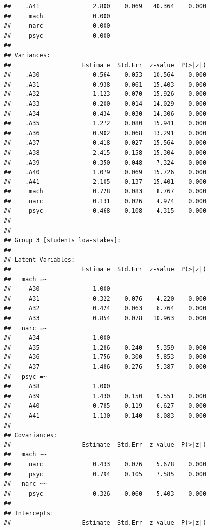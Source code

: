 \documentclass[
  english,
  man]{apa6}
\begin{document}
\begin{verbatim}
##    .A41               2.800    0.069   40.364    0.000
##     mach              0.000                           
##     narc              0.000                           
##     psyc              0.000                           
## 
## Variances:
##                    Estimate  Std.Err  z-value  P(>|z|)
##    .A30               0.564    0.053   10.564    0.000
##    .A31               0.938    0.061   15.403    0.000
##    .A32               1.123    0.070   15.926    0.000
##    .A33               0.200    0.014   14.029    0.000
##    .A34               0.434    0.030   14.306    0.000
##    .A35               1.272    0.080   15.941    0.000
##    .A36               0.902    0.068   13.291    0.000
##    .A37               0.418    0.027   15.564    0.000
##    .A38               2.415    0.158   15.304    0.000
##    .A39               0.350    0.048    7.324    0.000
##    .A40               1.079    0.069   15.726    0.000
##    .A41               2.105    0.137   15.401    0.000
##     mach              0.728    0.083    8.767    0.000
##     narc              0.131    0.026    4.974    0.000
##     psyc              0.468    0.108    4.315    0.000
## 
## 
## Group 3 [students low-stakes]:
## 
## Latent Variables:
##                    Estimate  Std.Err  z-value  P(>|z|)
##   mach =~                                             
##     A30               1.000                           
##     A31               0.322    0.076    4.220    0.000
##     A32               0.424    0.063    6.764    0.000
##     A33               0.854    0.078   10.963    0.000
##   narc =~                                             
##     A34               1.000                           
##     A35               1.286    0.240    5.359    0.000
##     A36               1.756    0.300    5.853    0.000
##     A37               1.486    0.276    5.387    0.000
##   psyc =~                                             
##     A38               1.000                           
##     A39               1.430    0.150    9.551    0.000
##     A40               0.785    0.119    6.627    0.000
##     A41               1.130    0.140    8.083    0.000
## 
## Covariances:
##                    Estimate  Std.Err  z-value  P(>|z|)
##   mach ~~                                             
##     narc              0.433    0.076    5.678    0.000
##     psyc              0.794    0.105    7.585    0.000
##   narc ~~                                             
##     psyc              0.326    0.060    5.403    0.000
## 
## Intercepts:
##                    Estimate  Std.Err  z-value  P(>|z|)

\end{verbatim}
\end{document}
